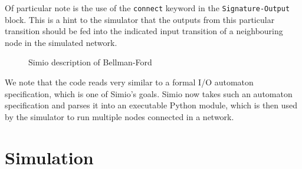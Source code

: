 \documentclass{scrartcl}
\def \kw#1{\texttt{\color{MidnightBlue}#1}}
\def \self {\texttt{\color{Cerulean}self}}
\def \py#1{\texttt{\color{LimeGreen}#1}}
\def \pyval#1{\texttt{\color{Sepia}#1}}
\begin{document}
Of particular note is the use of the \kw{connect} keyword in the
\kw{Signature-Output} block. This is a hint to the simulator that the outputs
from this particular transition should be fed into the indicated input
transition of a neighbouring node in the simulated network.

\begin{figure}
\caption{Simio description of Bellman-Ford}\label{alg:1}
\end{figure}

We note that the code reads very similar to a formal I/O automaton
specification, which is one of Simio's goals. Simio now takes such an automaton
specification and parses it into an executable Python module, which is then
used by the simulator to run multiple nodes connected in a network.

\section{Simulation}\label{sec:sim}

\end{document}
